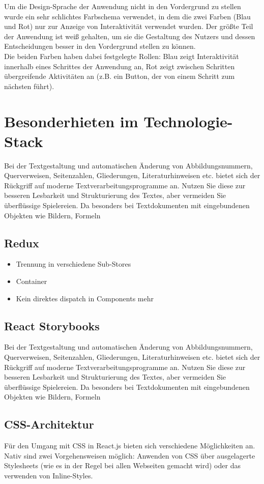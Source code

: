 Um die Design-Sprache der Anwendung nicht in den Vordergrund zu stellen wurde ein sehr schlichtes Farbschema verwendet, in dem die zwei Farben (Blau und Rot) nur zur Anzeige von Interaktivität verwendet wurden. Der größte Teil der Anwendung ist weiß gehalten, um sie die Gestaltung des Nutzers und dessen Entscheidungen besser in den Vordergrund stellen zu können.\\
Die beiden Farben haben dabei festgelegte Rollen: Blau zeigt Interaktivität innerhalb eines Schrittes der Anwendung an, Rot zeigt zwischen Schritten übergreifende Aktivitäten an (z.B. ein Button, der von einem Schritt zum nächsten führt).

\section{Besonderhieten im Technologie-Stack}
Bei der Textgestaltung und automatischen Änderung von Abbildungsnummern, Querverweisen,
Seitenzahlen, Gliederungen, Literaturhinweisen etc. bietet sich der Rückgriff
auf moderne Textverarbeitungsprogramme an. Nutzen Sie diese zur besseren Lesbarkeit
und Strukturierung des Textes, aber vermeiden Sie überflüssige Spielereien. Da
besonders bei Textdokumenten mit eingebundenen Objekten wie Bildern, Formeln

\subsection{Redux}
\begin{itemize}
  \item Trennung in verschiedene Sub-Stores
  \item Container
  \item Kein direktes dispatch in Components mehr
\end{itemize}

\subsection{React Storybooks}
Bei der Textgestaltung und automatischen Änderung von Abbildungsnummern, Querverweisen,
Seitenzahlen, Gliederungen, Literaturhinweisen etc. bietet sich der Rückgriff
auf moderne Textverarbeitungsprogramme an. Nutzen Sie diese zur besseren Lesbarkeit
und Strukturierung des Textes, aber vermeiden Sie überflüssige Spielereien. Da
besonders bei Textdokumenten mit eingebundenen Objekten wie Bildern, Formeln

\subsection{CSS-Architektur}
Für den Umgang mit CSS in React.js bieten sich verschiedene Möglichkeiten an. Nativ sind zwei Vorgehensweisen möglich: Anwenden von CSS über ausgelagerte Stylesheets (wie es in der Regel bei allen Webseiten gemacht wird) oder das verwenden von Inline-Styles.

